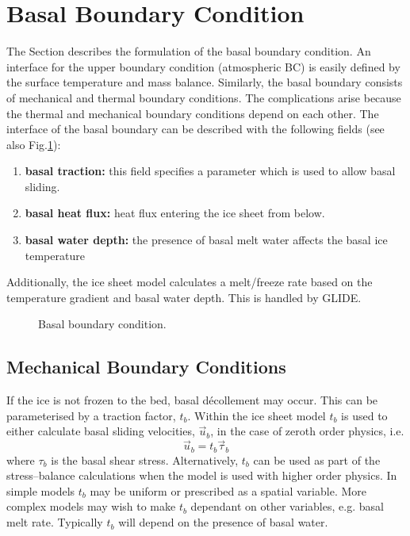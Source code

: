 \section{Basal Boundary Condition}
The Section describes the formulation of the basal boundary condition.
An interface for the upper boundary condition (atmospheric BC) is easily defined by the surface temperature and mass balance. Similarly, the basal boundary consists of mechanical and thermal boundary conditions. The complications arise because the thermal and mechanical boundary conditions depend on each other. The interface of the basal boundary can be described with the following fields (see also Fig.\ref{num.fig.basal_bc}):
\begin{enumerate}
\item \textbf{basal traction:} this field specifies a parameter which is used to allow basal sliding.
\item \textbf{basal heat flux:} heat flux entering the ice sheet from below.
\item \textbf{basal water depth:} the presence of basal melt water affects the basal ice temperature
\end{enumerate}
Additionally, the ice sheet model calculates a melt/freeze rate based on the temperature gradient and basal water depth. This is handled by GLIDE.

\begin{figure}[htbp]
  \centering
  \caption{Basal boundary condition.}
  \label{num.fig.basal_bc}
\end{figure}

\subsection{Mechanical Boundary Conditions}
If the ice is not frozen to the bed, basal d\'{e}collement may occur. This can be parameterised by a traction factor, $t_b$. Within the ice sheet model $t_b$ is used to either calculate basal sliding velocities, $\vec{u}_b$, in the case of zeroth order physics, i.e.
\begin{equation}
  \vec{u}_b=t_b\vec{\tau}_b
\end{equation}
where $\tau_b$ is the basal shear stress. Alternatively, $t_b$ can be used as part of the stress--balance calculations when the model is used with higher order physics. In simple models $t_b$ may be uniform or prescribed as a spatial variable. More complex models may wish to make $t_b$ dependant on other variables, e.g. basal melt rate. Typically $t_b$ will depend on the presence of basal water.

